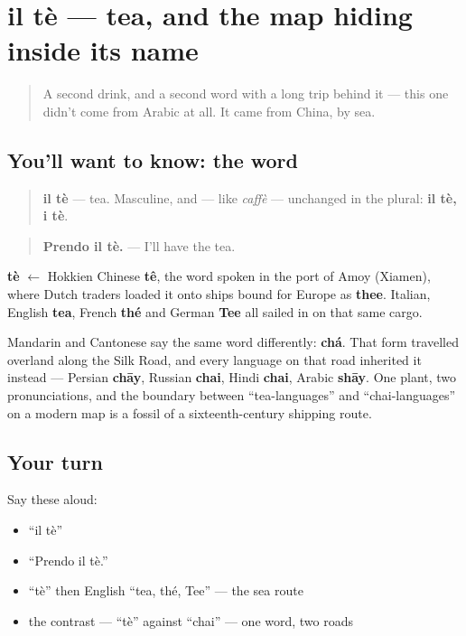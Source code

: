 \section[il tè]{il tè — tea, and the map hiding inside its name}

\label{lesson:IT-C22-te}



\begin{quote}
A second drink, and a second word with a long trip behind it — this one didn't come from Arabic at all. It came from China, by sea.
\end{quote}

\subsection*{You'll want to know: the word}
\begin{quote}
\textbf{il tè} — tea. Masculine, and — like \emph{caffè} — unchanged in the plural: \textbf{il tè, i tè}.
\end{quote}

\begin{quote}
\textbf{Prendo il tè.} — I'll have the tea.
\end{quote}

\begin{cousinweb}
\textbf{tè} $\leftarrow$ Hokkien Chinese \textbf{tê}, the word spoken in the port of Amoy (Xiamen), where Dutch traders loaded it onto ships bound for Europe as \textbf{thee}. Italian, English \textbf{tea}, French \textbf{thé} and German \textbf{Tee} all sailed in on that same cargo.

Mandarin and Cantonese say the same word differently: \textbf{chá}. That form travelled overland along the Silk Road, and every language on that road inherited it instead — Persian \textbf{chāy}, Russian \textbf{chai}, Hindi \textbf{chai}, Arabic \textbf{shāy}. One plant, two pronunciations, and the boundary between \textquotedblleft{}tea-languages\textquotedblright{} and \textquotedblleft{}chai-languages\textquotedblright{} on a modern map is a fossil of a sixteenth-century shipping route.
\end{cousinweb}

\subsection*{Your turn}
Say these aloud:

\begin{itemize}
\raggedright
  \item \textquotedblleft{}il tè\textquotedblright{}
  \item \textquotedblleft{}Prendo il tè.\textquotedblright{}
  \item \textquotedblleft{}tè\textquotedblright{} then English \textquotedblleft{}tea, thé, Tee\textquotedblright{} — the sea route
  \item the contrast — \textquotedblleft{}tè\textquotedblright{} against \textquotedblleft{}chai\textquotedblright{} — one word, two roads
\end{itemize}

